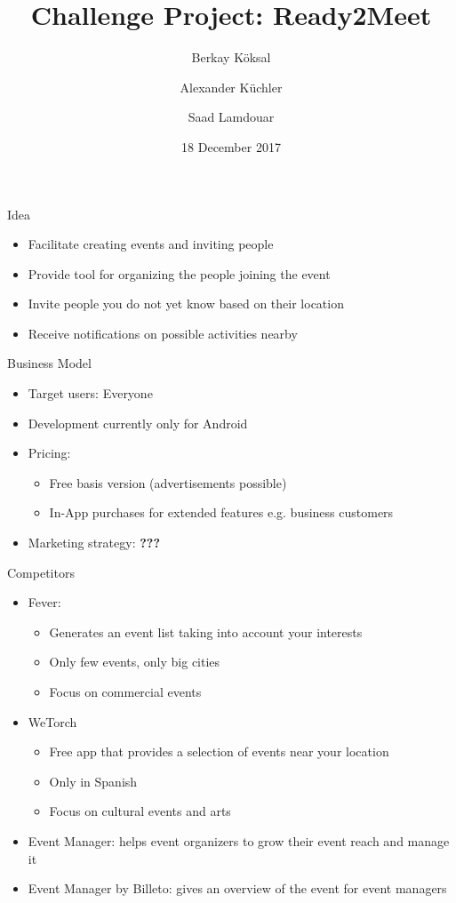 \documentclass[logo=EURECOM,english]{eurecombeamer}
\date{18 December 2017}
\title{Challenge Project: Ready2Meet}
\author{Berkay K\"oksal \and Alexander K\"uchler \and Saad Lamdouar}
\institute{\EURECOMname}
\newcommand{\todo}[1]{\textbf{\color{red} #1}}
\begin{document}
\maketitleframeEURECOM

\begin{frame}{Idea}
\begin{itemize}
\item Facilitate creating events and inviting people
\item Provide tool for organizing the people joining the event
\item Invite people you do not yet know based on their location
\item Receive notifications on possible activities nearby
\end{itemize}
\end{frame}

\begin{frame}{Business Model}
\begin{itemize}
\item Target users: Everyone
\item Development currently only for Android
\item Pricing:
	\begin{itemize}
	\item Free basis version (advertisements possible)
	\item In-App purchases for extended features e.g. business customers
	\end{itemize}
\item Marketing strategy: \todo{???}
\end{itemize}
\end{frame}

\begin{frame}{Competitors}
\begin{itemize}
\item Fever:
	\begin{itemize}
	\item Generates an event list taking into account your interests
	\item Only few events, only big cities
	\item Focus on commercial events
	\end{itemize}
\item WeTorch
	\begin{itemize}
	\item Free app that provides a selection of events near your location
	\item Only in Spanish
	\item Focus on cultural events and arts
	\end{itemize}
\item Event Manager: helps event organizers to grow their event reach and manage it
\item Event Manager by Billeto: gives an overview of the event for event managers
\end{itemize}
\end{frame}
\end{document}
